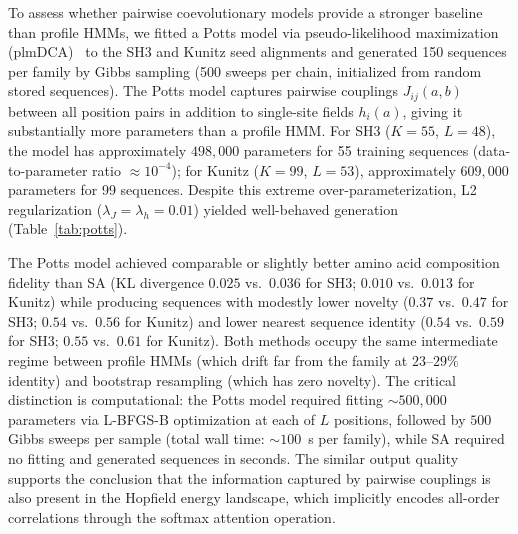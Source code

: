 To assess whether pairwise coevolutionary models provide a stronger baseline than profile HMMs, we fitted a Potts model via pseudo-likelihood maximization (plmDCA)~\cite{ekeberg2013improved} to the SH3 and Kunitz seed alignments and generated 150 sequences per family by Gibbs sampling (500 sweeps per chain, initialized from random stored sequences). The Potts model captures pairwise couplings $J_{ij}(a,b)$ between all position pairs in addition to single-site fields $h_i(a)$, giving it substantially more parameters than a profile HMM. For SH3 ($K{=}55$, $L{=}48$), the model has approximately $498{,}000$ parameters for 55 training sequences (data-to-parameter ratio $\approx 10^{-4}$); for Kunitz ($K{=}99$, $L{=}53$), approximately $609{,}000$ parameters for 99 sequences. Despite this extreme over-parameterization, L2 regularization ($\lambda_J{=}\lambda_h{=}0.01$) yielded well-behaved generation (Table~\ref{tab:potts}).

The Potts model achieved comparable or slightly better amino acid composition fidelity than SA (KL divergence $0.025$ vs.\ $0.036$ for SH3; $0.010$ vs.\ $0.013$ for Kunitz) while producing sequences with modestly lower novelty ($0.37$ vs.\ $0.47$ for SH3; $0.54$ vs.\ $0.56$ for Kunitz) and lower nearest sequence identity ($0.54$ vs.\ $0.59$ for SH3; $0.55$ vs.\ $0.61$ for Kunitz). Both methods occupy the same intermediate regime between profile HMMs (which drift far from the family at $23$--$29\%$ identity) and bootstrap resampling (which has zero novelty). The critical distinction is computational: the Potts model required fitting ${\sim}500{,}000$ parameters via L-BFGS-B optimization at each of $L$ positions, followed by $500$ Gibbs sweeps per sample (total wall time: ${\sim}100$~s per family), while SA required no fitting and generated sequences in seconds. The similar output quality supports the conclusion that the information captured by pairwise couplings is also present in the Hopfield energy landscape, which implicitly encodes all-order correlations through the softmax attention operation.

